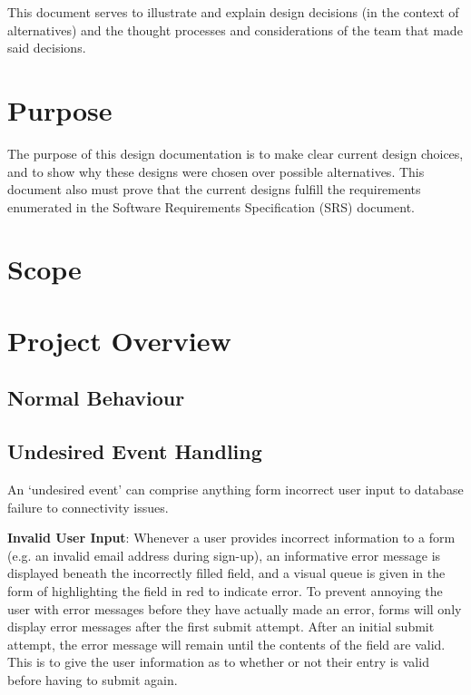 \documentclass[12pt, titlepage]{article}
\begin{document}
	
	This document serves to illustrate and explain design decisions (in the context of alternatives) and the thought processes and considerations of the team that made said decisions.
	\section{Purpose}
	
	
	
	The purpose of this design documentation is to make clear current design choices, and to show why these designs were chosen over possible alternatives. This document also must prove that the current designs fulfill the requirements enumerated in the Software Requirements Specification (SRS) document.
	
	\section{Scope}
	
	
	\section{Project Overview}
	
	\subsection{Normal Behaviour}
	
	\subsection{Undesired Event Handling}
	
	
	An `undesired event' can comprise anything form incorrect user input to database failure to connectivity issues. 
	
	\textbf{Invalid User Input}: Whenever a user provides incorrect information to a form (e.g. an invalid email address during sign-up), an informative error message is displayed beneath the incorrectly filled field, and a visual queue is given in the form of highlighting the field in red to indicate error. To prevent annoying the user with error messages before they have actually made an error, forms will only display error messages after the first submit attempt. After an initial submit attempt, the error message will remain until the contents of the field are valid. This is to give the user information as to whether or not their entry is valid before having to submit again.
	
\end{document}

